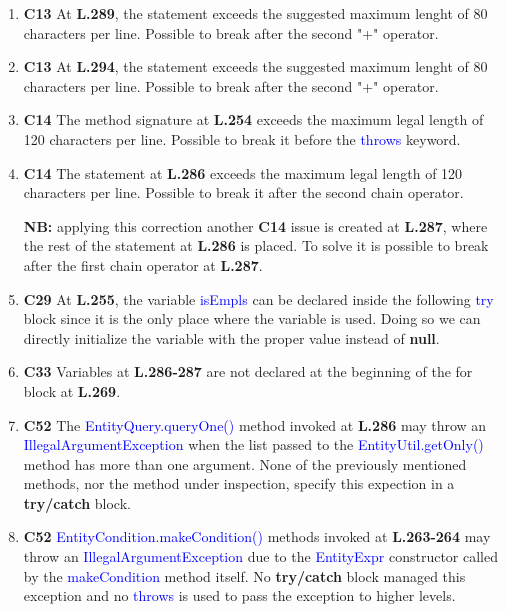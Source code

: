 \begin{enumerate}
	\item \textbf{C13} At \textbf{L.289}, the statement exceeds the suggested maximum lenght of 80 characters per line. Possible to break after the second "+" operator.

	\item \textbf{C13} At \textbf{L.294}, the statement exceeds the suggested maximum lenght of 80 characters per line. Possible to break after the second "+" operator.

	\item \textbf{C14} The method signature at \textbf{L.254} exceeds the maximum legal length of 120 characters per line. Possible to break it before the \textcolor{blue}{throws} keyword.

	\item \textbf{C14} The statement at \textbf{L.286} exceeds the maximum legal length of 120 characters per line. Possible to break it after the second chain operator.

	\textbf{NB:} applying this correction another \textbf{C14} issue is created at \textbf{L.287}, where the rest of the statement at \textbf{L.286} is placed. To solve it is possible to break after the first chain operator at \textbf{L.287}.

	\item \textbf{C29} At \textbf{L.255}, the variable
		\textcolor{blue}{isEmpls} can be declared inside the following
		\textcolor{blue}{try} block since it is the only place where the variable is
		used. Doing so we can directly initialize the variable with the proper value
		instead of \textbf{null}.

	\item \textbf{C33} Variables at \textbf{L.286-287} are not declared at the beginning of the for block at \textbf{L.269}.

	\item \textbf{C52} The \textcolor{blue}{EntityQuery.queryOne()} method invoked at \textbf{L.286} may throw an \textcolor{blue}{IllegalArgumentException} when the list passed to the \textcolor{blue}{EntityUtil.getOnly()} method has more than one argument.
		None of the previously mentioned methods, nor the method under inspection, specify this expection in a \textbf{try/catch} block.

	\item \textbf{C52} \textcolor{blue}{EntityCondition.makeCondition()} methods invoked at \textbf{L.263-264} may throw an \textcolor{blue}{IllegalArgumentException} due to the \textcolor{blue}{EntityExpr} constructor called by the \textcolor{blue}{makeCondition} method itself. No \textbf{try/catch} block managed this exception and no \textcolor{blue}{throws} is used to pass the exception to higher levels.


\end{enumerate}

